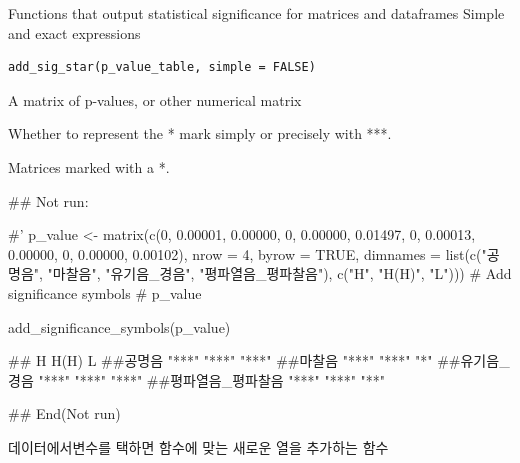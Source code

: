 \documentclass[a4paper]{book}
\begin{document}
%
\begin{Description}
Functions that output statistical significance for matrices and dataframes Simple and exact expressions
\end{Description}
%
\begin{Usage}
\begin{verbatim}
add_sig_star(p_value_table, simple = FALSE)
\end{verbatim}
\end{Usage}
%
\begin{Arguments}
\begin{ldescription}
\item[\code{p\_value\_table}] A matrix of p-values, or other numerical matrix

\item[\code{simple}] Whether to represent the * mark simply or precisely with ***.
\end{ldescription}
\end{Arguments}
%
\begin{Value}
Matrices marked with a *.
\end{Value}
%
\begin{Examples}
\begin{ExampleCode}

 ## Not run: 

 #' p_value <- matrix(c(0, 0.00001, 0.00000,
                    0, 0.00000, 0.01497,
                    0, 0.00013, 0.00000,
                    0, 0.00000, 0.00102),
                  nrow = 4, byrow = TRUE,
                  dimnames = list(c("공명음", "마찰음", "유기음_경음", "평파열음_평파찰음"),
                                  c("H", "H(H)", "L")))
     # Add significance symbols
     # p_value

     add_significance_symbols(p_value)

 ##                  H     H(H)  L
 ##공명음            "***" "***" "***"
 ##마찰음            "***" "***" "*"
 ##유기음_경음       "***" "***" "***"
 ##평파열음_평파찰음 "***" "***" "**"




 
## End(Not run)


\end{ExampleCode}
\end{Examples}
%
\begin{Description}
데이터에서변수를 택하면 함수에 맞는 새로운 열을 추가하는 함수
\end{Description}
\end{document}
